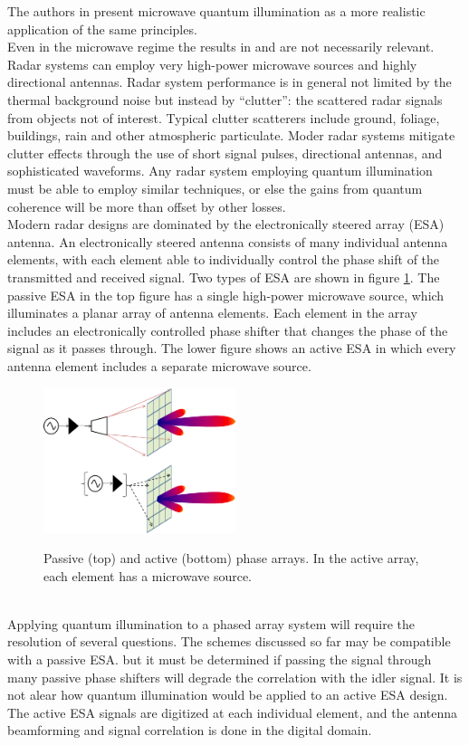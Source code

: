 \documentclass[a4paper,11pt, twocolumn]{article}
\numberwithin{equation}{section}
\begin{document}
The authors in \cite{qi} present microwave quantum illumination as a more realistic application of the same principles.
\\
Even in the microwave regime the results in \cite{qig} and \cite{qi} are not necessarily relevant. 
Radar systems can employ very high-power microwave sources and highly directional antennas.
Radar system performance is in general not limited by the thermal background noise but instead by ``clutter'': the scattered radar signals from objects not of interest.
Typical clutter scatterers include ground, foliage, buildings, rain and other atmospheric particulate.
Moder radar systems mitigate clutter effects through the use of short signal pulses, directional antennas, and sophisticated waveforms.
Any radar system employing quantum illumination must be able to employ similar techniques, or else the gains from quantum coherence will be more than offset by other losses. 
\\
Modern radar designs are dominated by the electronically steered array (ESA) antenna. 
An electronically steered antenna consists of many individual antenna elements, with each element able to individually control the phase shift of the transmitted and received signal.
Two types of ESA are shown in figure \ref{fig:phasedarrays}. The passive ESA in the top figure has a single high-power microwave source, which illuminates a planar array of antenna elements.
Each element in the array includes an electronically controlled phase shifter that changes the phase of the signal as it passes through.
The lower figure shows an active ESA in which every antenna element includes a separate microwave source.
\begin{figure}[ht]
 \caption{Passive (top) and active (bottom) phase arrays. In the active array, each element has a microwave source.}
 \centering
   \includegraphics[width=0.5\textwidth]{figs/PhasedArrays}
 \label{fig:phasedarrays}
\end{figure}
\\
Applying quantum illumination to a phased array system will require the resolution of several questions.
The schemes discussed so far may be compatible with a passive ESA. but it must be determined if passing the signal through many passive phase shifters will degrade the correlation with the idler signal.
It is not alear how quantum illumination would be applied to an active ESA design. The active ESA signals are digitized at each individual element, and the antenna beamforming and signal correlation is done in the digital domain.


\printbibliography
\end{document}
